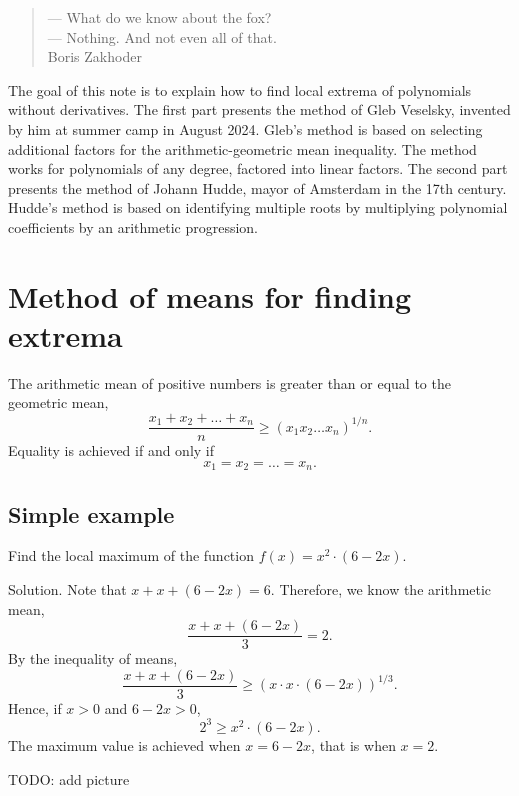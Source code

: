 \documentclass[12pt]{article}
\begin{document}
\begin{verse}
    \begin{flushright}
        — What do we know about the fox? \\
        — Nothing. And not even all of that. \\

        Boris Zakhoder
    \end{flushright}
\end{verse}

The goal of this note is to explain how to find local extrema of polynomials without derivatives.
The first part presents the method of Gleb Veselsky, invented by him at summer camp in August 2024.
Gleb's method is based on selecting additional factors for the arithmetic-geometric mean inequality.
The method works for polynomials of any degree, factored into linear factors.
The second part presents the method of Johann Hudde, mayor of Amsterdam in the 17th century. 
Hudde's method is based on identifying multiple roots by multiplying polynomial coefficients by an arithmetic progression.


\section{Method of means for finding extrema}

\begin{tcolorbox}[colback=yellow!50!red!25!white]
The arithmetic mean of positive numbers is greater than or equal to the geometric mean,
\[
\frac{x_1 + x_2 + \dots + x_n}{n} \geq (x_1 x_2 \dots x_n)^{1/n}.
\]
Equality is achieved if and only if
\[
x_1 = x_2 = \dots = x_n.
\]
\end{tcolorbox}

\subsection*{Simple example}

Find the local maximum of the function $f(x) = x^2 \cdot (6 - 2x)$.


Solution. Note that $x + x + (6 - 2x) = 6$.
Therefore, we know the arithmetic mean,
\[
\frac{x + x + (6- 2x)}{3} = 2.
\]
By the inequality of means,
\[
\frac{x + x + (6- 2x)}{3} \geq (x\cdot x \cdot (6 - 2x))^{1/3}.
\]
Hence, if $x > 0$ and $6 - 2x>0$, 
\[
2^3 \geq x^2 \cdot (6 - 2x).
\]
The maximum value is achieved when $x = 6 - 2x$, that is when $x=2$.


TODO: add picture
\end{document}

